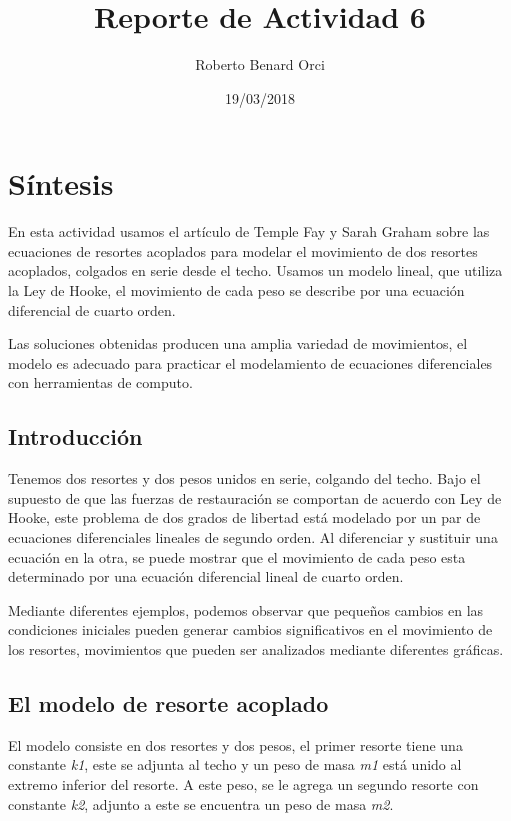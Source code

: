 \documentclass{article}
\title{Reporte de Actividad 6}
\author{Roberto Benard Orci}
\date{19/03/2018}
\begin{document}
\maketitle

\section{Síntesis}

En esta actividad usamos el artículo de Temple Fay y Sarah Graham sobre las ecuaciones de resortes acoplados para modelar el movimiento de dos resortes acoplados, colgados en serie desde el techo. Usamos un modelo lineal, que utiliza la Ley de Hooke, el movimiento de cada peso se describe por una ecuación diferencial de cuarto orden.

\vspace{0.3cm}

Las soluciones obtenidas producen una amplia variedad de movimientos, el modelo es adecuado para practicar el modelamiento de ecuaciones diferenciales con herramientas de computo. 

\subsection*{Introducción}

Tenemos dos resortes y dos pesos unidos en serie, colgando del techo. Bajo el supuesto de que las fuerzas de restauración se comportan de acuerdo con Ley de Hooke, este problema de dos grados de libertad está modelado por un par de ecuaciones diferenciales lineales de segundo orden. Al diferenciar y sustituir una ecuación en la otra, se puede mostrar que el movimiento de cada peso esta determinado por una ecuación diferencial lineal de cuarto orden.

\vspace{0.3cm}

Mediante diferentes ejemplos, podemos observar que pequeños cambios en las condiciones iniciales pueden generar cambios significativos en el movimiento de los resortes, movimientos que pueden ser analizados mediante diferentes gráficas.

\subsection*{El modelo de resorte acoplado}

El modelo consiste en dos resortes y dos pesos, el primer resorte tiene una constante \textit{k1}, este se adjunta al techo y un peso de masa \textit{m1} está unido al extremo inferior del resorte. A este peso, se le agrega un segundo resorte con constante \textit{k2}, adjunto a este se encuentra un peso de masa \textit{m2}.
\end{document}
